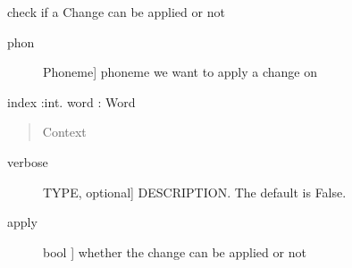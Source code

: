 \documentclass[letterpaper,10pt,english]{sphinxmanual}
\begin{document}
\begin{fulllineitems}
\begin{fulllineitems}
\label{\detokenize{index:Change.I_change.check}}
\sphinxAtStartPar
check if a Change can be applied or not
\begin{description}
\item[{phon}] \leavevmode{[}Phoneme{]}
\sphinxAtStartPar
phoneme we want to apply a change on

\end{description}

\sphinxAtStartPar
index :int.
word : Word
\begin{quote}

\sphinxAtStartPar
Context
\end{quote}
\begin{description}
\item[{verbose}] \leavevmode{[}TYPE, optional{]}
\sphinxAtStartPar
DESCRIPTION. The default is False.

\end{description}
\begin{description}
\item[{apply}] \leavevmode{[}bool {]}
\sphinxAtStartPar
whether the change can be applied or not

\end{description}

\end{fulllineitems}


\end{fulllineitems}

\end{document}
